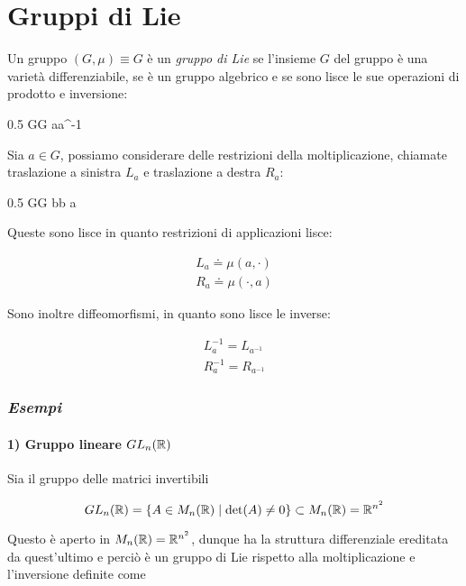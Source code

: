 \section{Gruppi di Lie}

Un gruppo $ (G,\mu) \equiv G $ è un \textit{gruppo di Lie} se l'insieme $ G $ del gruppo è una varietà differenziabile, se è un gruppo algebrico e se sono lisce le sue operazioni di prodotto e inversione:

	{0.5}{%
				{G}{G}
				{a}{a^{-1}}
			}
		
Sia $ a \in G $, possiamo considerare delle restrizioni della moltiplicazione, chiamate traslazione a sinistra $ L_{a} $ e traslazione a destra $ R_{a} $:

	{0.5}{%
				{G}{G}
				{b}{b a}
			}

Queste sono lisce in quanto restrizioni di applicazioni lisce:

\begin{gather}
	L_{a} \doteq \mu(a,\cdot) \\
	R_{a} \doteq \mu(\cdot,a) 
\end{gather}

Sono inoltre diffeomorfismi, in quanto sono lisce le inverse:

\begin{gather}
	L_{a}^{-1} = L_{a^{-1}} \\
	R_{a}^{-1} = R_{a^{-1}}
\end{gather}

\subsubsection{\textit{Esempi}}

\paragraph{1) Gruppo lineare $ GL_{n}(\mathbb{R}) $}

Sia il gruppo delle matrici invertibili

\begin{equation}
	GL_{n}(\mathbb{R}) = \{ A \in M_{n}(\mathbb{R}) \mid \det(A) \neq 0 \} \subset M_{n}(\mathbb{R}) = \mathbb{R}^{n^{2}}
\end{equation}

Questo è aperto in $ M_{n}(\mathbb{R}) = \mathbb{R}^{n^{2}} $, dunque ha la struttura differenziale ereditata da quest'ultimo e perciò è un gruppo di Lie rispetto alla moltiplicazione e l'inversione definite come

